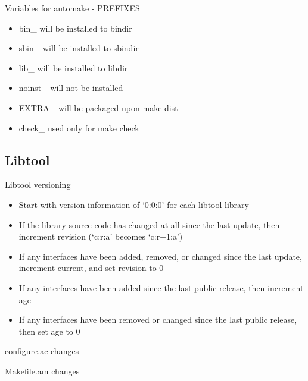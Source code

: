 \documentclass{beamer}
\begin{document}
\begin{frame}{Variables for automake - PREFIXES}
    \begin{itemize}
    \item bin\_	will be installed to bindir
    \item sbin\_	will be installed to sbindir
    \item lib\_	will be installed to libdir
    \item noinst\_	will not be installed
    \item EXTRA\_	will be packaged upon make dist
    \item check\_	used only for make check
    \end{itemize}
\end{frame}

\subsection{Libtool}

\begin{frame}{Libtool versioning}
	\begin{itemize}
	\item Start with version information of ‘0:0:0’ for each libtool library
	\item If the library source code has changed at all since the last update, then increment revision (‘c:r:a’ becomes ‘c:r+1:a’)
	\item If any interfaces have been added, removed, or changed since the last update, increment current, and set revision to 0
	\item If any interfaces have been added since the last public release, then increment age
	\item If any interfaces have been removed or changed since the last public release, then set age to 0
	\end{itemize}
\end{frame}

\begin{frame}[t]{configure.ac changes}
	\begin{small}
	
	\end{small}
\end{frame}

\begin{frame}[t]{Makefile.am changes}
	\begin{small}
	
	\end{small}
\end{frame}
\end{document}
